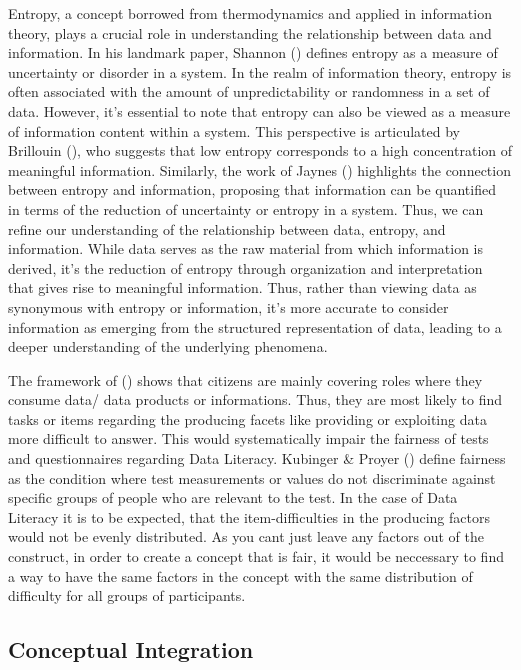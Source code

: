 \documentclass[
  12pt,
  a4paper,
  twoside]{article}
\begin{document}
Entropy, a concept borrowed from thermodynamics and applied in
information theory, plays a crucial role in understanding the
relationship between data and information. In his landmark paper,
Shannon () defines entropy as a measure
of uncertainty or disorder in a system. In the realm of information
theory, entropy is often associated with the amount of unpredictability
or randomness in a set of data. However, it's essential to note that
entropy can also be viewed as a measure of information content within a
system. This perspective is articulated by Brillouin
(), who suggests that low entropy
corresponds to a high concentration of meaningful information.
Similarly, the work of Jaynes ()
highlights the connection between entropy and information, proposing
that information can be quantified in terms of the reduction of
uncertainty or entropy in a system. Thus, we can refine our
understanding of the relationship between data, entropy, and
information. While data serves as the raw material from which
information is derived, it's the reduction of entropy through
organization and interpretation that gives rise to meaningful
information. Thus, rather than viewing data as synonymous with entropy
or information, it's more accurate to consider information as emerging
from the structured representation of data, leading to a deeper
understanding of the underlying phenomena.

The framework of () shows
that citizens are mainly covering roles where they consume data/ data
products or informations. Thus, they are most likely to find tasks or
items regarding the producing facets like providing or exploiting data
more difficult to answer. This would systematically impair the fairness
of tests and questionnaires regarding Data Literacy. Kubinger \& Proyer
() define fairness as the condition
where test measurements or values do not discriminate against specific
groups of people who are relevant to the test. In the case of Data
Literacy it is to be expected, that the item-difficulties in the
producing factors would not be evenly distributed. As you cant just
leave any factors out of the construct, in order to create a concept
that is fair, it would be neccessary to find a way to have the same
factors in the concept with the same distribution of difficulty for all
groups of participants.

\subsection{Conceptual Integration}\label{conceptual-integration}
\end{document}
